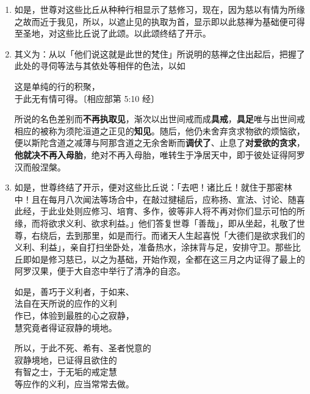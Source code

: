 \begin{enumerate}\item 如是，世尊对这些比丘从种种行相显示了慈修习，现在，因为慈以有情为所缘之故而近于我见，所以，以遮止见的执取为首，显示即以此慈禅为基础便可得至圣地，对这些比丘说了此颂。以此颂终结了开示。
\item 其义为：从以「他们说这就是此世的梵住」所说明的慈禅之住出起后，把握了此处的寻伺等法与其依处等相伴的色法，以如\begin{quoting}这是单纯的行的积聚，\\于此无有情可得。{\bluefootnotesize 〔相应部第 5:10 经〕}\end{quoting}所说的名色差别而\textbf{不再执取见}，渐次以出世间戒而成\textbf{具戒}，\textbf{具足}唯与出世间戒相应的被称为须陀洹道之正见的\textbf{知见}。随后，他仍未舍弃贪求物欲的烦恼欲，便以斯陀含道之减薄与阿那含道之无余舍断而\textbf{调伏了}、止息了\textbf{对爱欲的贪求}，\textbf{他就决不再入母胎}，绝对不再入母胎，唯转生于净居天中，即于彼处证得阿罗汉而般涅槃。
\item 如是，世尊终结了开示，便对这些比丘说：「去吧！诸比丘！就住于那密林中！且在每月八次闻法等场合中，在敲过揵槌后，应称扬、宣法、讨论、随喜此经，于此业处则应修习、培育、多作，彼等非人将不再对你们显示可怕的所缘，而将欲求义利、欲求利益。」他们答复世尊「善哉」，即从坐起，礼敬了世尊，右绕后，去到那里，如是而行。而诸天人生起喜悦「大德们是欲求我们的义利、利益」，亲自打扫坐卧处，准备热水，涂抹背与足，安排守卫。那些比丘即如是修习慈已，以之为基础，开始作观，全都在这三月之内证得了最上的阿罗汉果，便于大自恣中举行了清净的自恣。\begin{quoting}如是，善巧于义利者，于如来、\\法自在天所说的应作的义利\\作已，体验到最胜的心之寂静，\\慧究竟者得证寂静的境地。\end{quoting}\begin{quoting}所以，于此不死、希有、圣者悦意的\\寂静境地，已证得且欲住的\\有智之士，于无垢的戒定慧\\等应作的义利，应当常常去做。\end{quoting}\end{enumerate}

